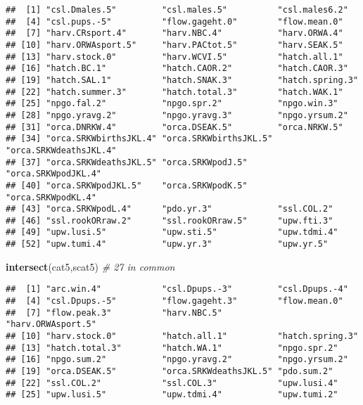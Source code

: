 \documentclass[]{article}
\newenvironment{Shaded}{\begin{snugshade}}{\end{snugshade}}
\newcommand{\KeywordTok}[1]{\textcolor[rgb]{0.13,0.29,0.53}{\textbf{{#1}}}}
\newcommand{\CommentTok}[1]{\textcolor[rgb]{0.56,0.35,0.01}{\textit{{#1}}}}
\newcommand{\NormalTok}[1]{{#1}}
\begin{document}
\begin{verbatim}
##  [1] "csl.Dmales.5"         "csl.males.5"          "csl.males6.2"        
##  [4] "csl.pups.-5"          "flow.gageht.0"        "flow.mean.0"         
##  [7] "harv.CRsport.4"       "harv.NBC.4"           "harv.ORWA.4"         
## [10] "harv.ORWAsport.5"     "harv.PACtot.5"        "harv.SEAK.5"         
## [13] "harv.stock.0"         "harv.WCVI.5"          "hatch.all.1"         
## [16] "hatch.BC.1"           "hatch.CAOR.2"         "hatch.CAOR.3"        
## [19] "hatch.SAL.1"          "hatch.SNAK.3"         "hatch.spring.3"      
## [22] "hatch.summer.3"       "hatch.total.3"        "hatch.WAK.1"         
## [25] "npgo.fal.2"           "npgo.spr.2"           "npgo.win.3"          
## [28] "npgo.yravg.2"         "npgo.yravg.3"         "npgo.yrsum.2"        
## [31] "orca.DNRKW.4"         "orca.DSEAK.5"         "orca.NRKW.5"         
## [34] "orca.SRKWbirthsJKL.4" "orca.SRKWbirthsJKL.5" "orca.SRKWdeathsJKL.4"
## [37] "orca.SRKWdeathsJKL.5" "orca.SRKWpodJ.5"      "orca.SRKWpodJKL.4"   
## [40] "orca.SRKWpodJKL.5"    "orca.SRKWpodK.5"      "orca.SRKWpodKL.4"    
## [43] "orca.SRKWpodL.4"      "pdo.yr.3"             "ssl.COL.2"           
## [46] "ssl.rookORraw.2"      "ssl.rookORraw.5"      "upw.fti.3"           
## [49] "upw.lusi.5"           "upw.sti.5"            "upw.tdmi.4"          
## [52] "upw.tumi.4"           "upw.yr.3"             "upw.yr.5"
\end{verbatim}

\begin{Shaded}
\begin{Highlighting}[]
\KeywordTok{intersect}\NormalTok{(cat5,scat5) }\CommentTok{# 27 in common }
\end{Highlighting}
\end{Shaded}

\begin{verbatim}
##  [1] "arc.win.4"            "csl.Dpups.-3"         "csl.Dpups.-4"        
##  [4] "csl.Dpups.-5"         "flow.gageht.3"        "flow.mean.0"         
##  [7] "flow.peak.3"          "harv.NBC.5"           "harv.ORWAsport.5"    
## [10] "harv.stock.0"         "hatch.all.1"          "hatch.spring.3"      
## [13] "hatch.total.3"        "hatch.WA.1"           "npgo.spr.2"          
## [16] "npgo.sum.2"           "npgo.yravg.2"         "npgo.yrsum.2"        
## [19] "orca.DSEAK.5"         "orca.SRKWdeathsJKL.5" "pdo.sum.2"           
## [22] "ssl.COL.2"            "ssl.COL.3"            "upw.lusi.4"          
## [25] "upw.lusi.5"           "upw.tdmi.4"           "upw.tumi.2"
\end{verbatim}
\end{document}
